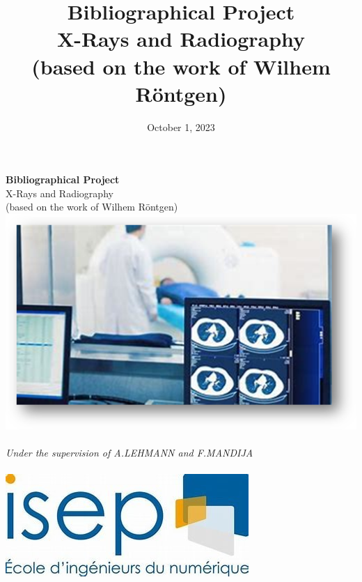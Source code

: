 \documentclass[a4paper,12pt]{report}
\title{Bibliographical Project \\ [1ex]\large X-Rays and Radiography \\ (based on the work of Wilhem Röntgen)  }
\author{  }
\date{October 1, 2023}
\begin{document}
\begin{titlepage}
  \centering
  \vspace{3cm}
  \Huge{\textbf{Bibliographical Project}}\\
  \vspace{1cm}
  \Large{X-Rays and Radiography \\ (based on the work of Wilhem Röntgen)} \\
  \vspace{0.5cm}
  \includegraphics[scale=1]{xray.png}\\
  \vspace{0.5cm}
   \\
  \vspace{1.5cm}
  \large{\textit {Under the supervision of A.LEHMANN and F.MANDIJA}} \\
  \vspace{1.5cm}
  \thedate \\
  \vspace{2cm}
  \includegraphics[scale=0.6]{Isep.jpg}\\
  
\end{titlepage}



\newpage

\tableofcontents
{}
\end{document}
